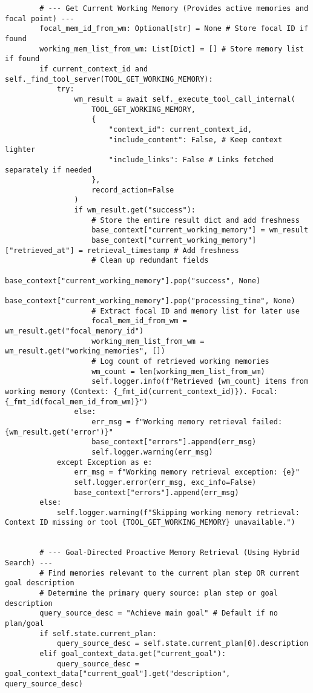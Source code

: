 \documentclass[12pt,a4paper]{article}
\begin{document}
\begin{pageablecode}
\begin{verbatim}
        # --- Get Current Working Memory (Provides active memories and focal point) ---
        focal_mem_id_from_wm: Optional[str] = None # Store focal ID if found
        working_mem_list_from_wm: List[Dict] = [] # Store memory list if found
        if current_context_id and self._find_tool_server(TOOL_GET_WORKING_MEMORY):
            try:
                wm_result = await self._execute_tool_call_internal(
                    TOOL_GET_WORKING_MEMORY,
                    {
                        "context_id": current_context_id,
                        "include_content": False, # Keep context lighter
                        "include_links": False # Links fetched separately if needed
                    },
                    record_action=False
                )
                if wm_result.get("success"):
                    # Store the entire result dict and add freshness
                    base_context["current_working_memory"] = wm_result
                    base_context["current_working_memory"]["retrieved_at"] = retrieval_timestamp # Add freshness
                    # Clean up redundant fields
                    base_context["current_working_memory"].pop("success", None)
                    base_context["current_working_memory"].pop("processing_time", None)
                    # Extract focal ID and memory list for later use
                    focal_mem_id_from_wm = wm_result.get("focal_memory_id")
                    working_mem_list_from_wm = wm_result.get("working_memories", [])
                    # Log count of retrieved working memories
                    wm_count = len(working_mem_list_from_wm)
                    self.logger.info(f"Retrieved {wm_count} items from working memory (Context: {_fmt_id(current_context_id)}). Focal: {_fmt_id(focal_mem_id_from_wm)}")
                else:
                    err_msg = f"Working memory retrieval failed: {wm_result.get('error')}"
                    base_context["errors"].append(err_msg)
                    self.logger.warning(err_msg)
            except Exception as e:
                err_msg = f"Working memory retrieval exception: {e}"
                self.logger.error(err_msg, exc_info=False)
                base_context["errors"].append(err_msg)
        else:
            self.logger.warning(f"Skipping working memory retrieval: Context ID missing or tool {TOOL_GET_WORKING_MEMORY} unavailable.")


        # --- Goal-Directed Proactive Memory Retrieval (Using Hybrid Search) ---
        # Find memories relevant to the current plan step OR current goal description
        # Determine the primary query source: plan step or goal description
        query_source_desc = "Achieve main goal" # Default if no plan/goal
        if self.state.current_plan:
            query_source_desc = self.state.current_plan[0].description
        elif goal_context_data.get("current_goal"):
            query_source_desc = goal_context_data["current_goal"].get("description", query_source_desc)


\end{verbatim}
\end{pageablecode}
\end{document}
